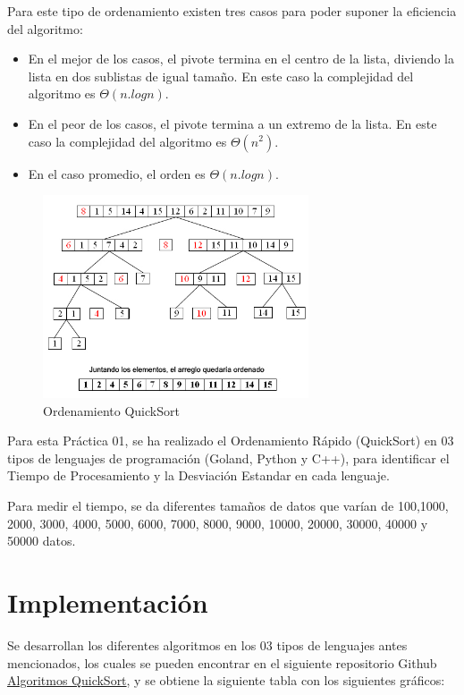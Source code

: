 \documentclass{article}
\begin{document}
\begin{enumerate}
    Para este tipo de ordenamiento existen tres casos para poder suponer la eficiencia del algoritmo:
     \begin{itemize}
            \item En el mejor de los casos, el pivote termina en el centro de la lista, diviendo la lista en dos sublistas de igual tamaño. En este caso la complejidad del algoritmo es $\Theta(n.log n)$.
            \item En el peor de los casos, el pivote termina a un extremo de la lista. En este caso la complejidad del algoritmo es $\Theta (n^2)$.
            \item En el caso promedio, el orden es $\Theta (n.log n)$.
    \end{itemize}

\begin{figure}[H]
\centering
\includegraphics[width=0.7\textwidth]{Imagen/Ejem_QuickSort.jpg}
\caption{Ordenamiento QuickSort}
\label{fig:QuickSort}
\end{figure}

   Para esta Práctica 01, se ha realizado el Ordenamiento Rápido (QuickSort) en 03 tipos de lenguajes de programación (Goland, Python y C++), para identificar el Tiempo de Procesamiento y la Desviación Estandar en cada lenguaje.

   Para medir el tiempo, se da diferentes tamaños de datos que varían de 100,1000, 2000, 3000, 4000, 5000, 6000, 7000, 8000, 9000, 10000, 20000, 30000, 40000 y 50000 datos.

\end{enumerate}


\section{Implementación}

  Se desarrollan los diferentes algoritmos en los 03 tipos de lenguajes antes mencionados, los cuales se pueden encontrar en el siguiente repositorio Github \href{https://github.com/josuemzx/Algoritmos_de_ordenamiento-/blob/main/Practica01_QuickSort.ipynb}{Algoritmos QuickSort}, y se obtiene la siguiente tabla con los siguientes gráficos:
\end{document}

